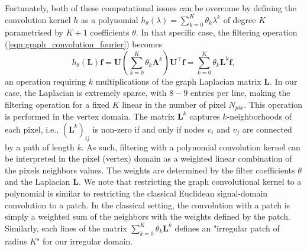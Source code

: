 \documentclass[final,twocolumn,3p,times,authoryear]{elsarticle}
\newcommand{\nati}[1]{{\color[rgb]{.1,.6,.1}{#1}}}
\newcommand{\TK}[1]{{\color{red}{TK:#1}}}
\newcommand{\todo}[1]{{\color[rgb]{.6,.1,.6}{#1}}}
\newcommand{\eqnref}[1]{(\ref{eqn:#1})}
\renewcommand{\b}[1]{{\bm{#1}}}   %
\newcommand{\1}{\b{1}}              %
\newcommand{\0}{\b{0}}              %
\renewcommand{\L}{\b{L}}
\newcommand{\U}{\b{U}}
\newcommand{\f}{\b{f}}
\newcommand{\trans}{^\intercal}
\newcommand{\bLambda}{\b{\Lambda}}
\begin{document}
Fortunately, both of these computational issues can be overcome by defining the convolution kernel $h$ as a polynomial $h_\theta(\lambda) = \sum_{k=0}^K \theta_k \lambda^k$ of degree $K$ parametrised by $K+1$ coefficients $\theta$.
In that specific case, the filtering operation \eqnref{graph_convolution_fourier} becomes
\begin{equation} \label{eqn:graph_convolution_monomial}
	h_\theta(\L) \f =  \U \left(\sum_{k=0}^K \theta_k \bLambda^k \right) \U\trans \f = \sum_{k=0}^K \theta_k \L^k \f,
\end{equation}
an operation requiring $k$ multiplications of the graph Laplacian matrix $\L$.
In our case, the Laplacian is extremely sparse, with $8-9$ entries per line, making the filtering operation for a fixed $K$ linear in the number of pixel $N_{pix}$.
This operation is performed in the vertex domain.
The matrix $\L^k$ captures $k$-neighborhoods of each pixel, i.e., $(\L^k)_{ij}$ is non-zero if and only if nodes $v_i$ and $v_j$ are connected by a path of length $k$.
As such, filtering with a polynomial convolution kernel can be interpreted in the pixel (vertex) domain as a weighted linear combination of the pixels neighbors values. The weights are determined by the filter coefficients $\theta$ and the Laplacian $\L$.
We note that restricting the graph convolutional kernel to a polynomial is similar to restricting the classical Euclidean signal-domain convolution to a patch. In the classical setting, the convolution with a patch is simply a weighted sum of the neighbors with the weights defined by the patch. Similarly, each lines of the matrix $\sum_{k=0}^K \theta_k \L^k$ defines an "irregular patch of radius $K$" for our irregular domain.

\end{document}
